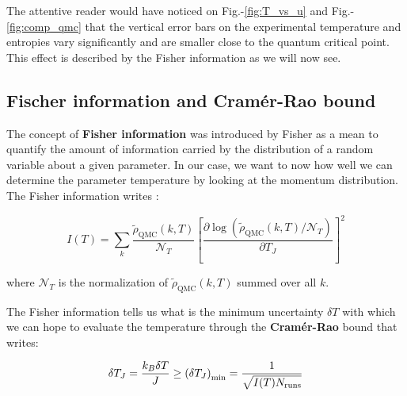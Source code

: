 The attentive reader would have noticed on Fig.-\ref{fig:T_vs_u} and Fig.-\ref{fig:comp_qmc} that the vertical error bars on the experimental temperature and entropies vary significantly and are smaller close to the quantum critical point. This effect is described by the Fisher information as we will now see.


\subsection{Fischer information and Cramér-Rao bound}

The concept of \textbf{Fisher information} was introduced by Fisher \cite{fisher1922mathematical} as a mean to quantify the amount of information carried by the distribution of a random variable about a given parameter. In our case, we want to now how well we can determine the parameter temperature by looking at the momentum distribution. The Fisher information writes \cite{van2007parameter}:

\begin{equation}
    I(T)=\sum_{k} \frac{\tilde{\rho}_{\mathrm{QMC}}(k, T)}{\mathcal{N}_{T}}\left[\frac{\partial \log \left(\tilde{\rho}_{\mathrm{QMC}}(k, T) / \mathcal{N}_{T}\right)}{\partial T_{J}}\right]^{2}
\end{equation}



\noindent where $\mathcal{N}_{T}$ is the normalization of $\tilde{\rho}_{\mathrm{QMC}}(k, T)$ summed over all $k$.

The Fisher information tells us what is the minimum uncertainty $\delta T$ with which we can hope to evaluate the temperature through the \textbf{Cramér-Rao} bound that writes:

\begin{equation}
    \delta T_{J}=\frac{k_{B} \delta T}{J} \geq\left(\delta T_{J}\right)_{\min }=\frac{1}{\sqrt{I(T) N_{\rm{runs}}}}
\end{equation}

